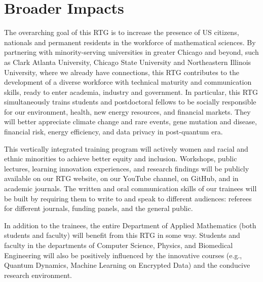 \documentclass[11pt]{NSFamsart}
\begin{document}
\section{Broader Impacts} 


 


 

The overarching goal of this RTG is to increase the presence of US citizens, nationals and permanent residents in the workforce of  mathematical sciences. 
By partnering with minority-serving  universities in greater Chicago and beyond, such as 
Clark Atlanta University, Chicago State University and Northeastern Illinois University, where we already have connections, this RTG   contributes to  the development of a diverse    workforce with technical maturity and communication skills, ready to enter academia, industry and government. In particular, this RTG simultaneously trains students and postdoctoral fellows to be socially responsible for our environment, health, new energy resources, and financial markets.  They will  better appreciate climate change and rare events, gene mutation and disease, financial risk, energy efficiency, and data privacy in post-quantum era.   
   

This vertically integrated training program will actively women  and racial and ethnic minorities to achieve better equity and inclusion.  Workshops, public lectures, learning innovation experiences, and research findings will be publicly available on our  RTG website, on our YouTube channel, on GitHub, and in academic journals.  The written and oral communication skills of our trainees will be built by requiring them to write to and speak to different audiences: referees for different journals, funding panels, and the general public. 

In addition to the trainees, the entire Department of Applied Mathematics (both students and faculty) will benefit from this RTG in some way. Students and faculty in the departments of Computer Science, Physics, and Biomedical Engineering will also be positively influenced by the innovative courses (e.g., Quantum Dynamics, Machine Learning on Encrypted Data) and the conducive research environment. 
 
\end{document}
